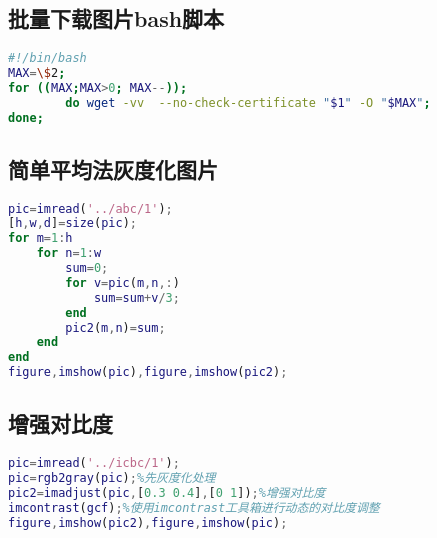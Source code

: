 \section{}
\subsection{批量下载图片bash脚本}\label{download_shell}
\begin{lstlisting}[caption=批量下载图片bash脚本,language=bash]
#!/bin/bash
MAX=\$2;
for ((MAX;MAX>0; MAX--));
        do wget -vv  --no-check-certificate "$1" -O "$MAX";
done;
\end{lstlisting}

\subsection{简单平均法灰度化图片}\label{gray_pic}
\begin{lstlisting}[caption=简单平均法灰度化图片,language=matlab]
pic=imread('../abc/1');
[h,w,d]=size(pic);
for m=1:h
    for n=1:w
        sum=0;
        for v=pic(m,n,:)
            sum=sum+v/3;
        end
        pic2(m,n)=sum;
    end
end
figure,imshow(pic),figure,imshow(pic2);
\end{lstlisting}

\subsection{增强对比度}\label{contrast}
\begin{lstlisting}[caption=增强对比度,language=matlab]
pic=imread('../icbc/1');
pic=rgb2gray(pic);%先灰度化处理
pic2=imadjust(pic,[0.3 0.4],[0 1]);%增强对比度
imcontrast(gcf);%使用imcontrast工具箱进行动态的对比度调整
figure,imshow(pic2),figure,imshow(pic);
\end{lstlisting}


